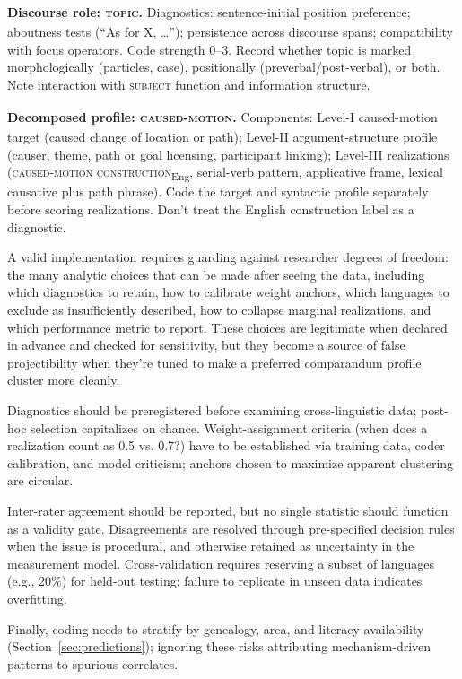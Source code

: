\documentclass[12pt]{article}
\begin{document}
\ex \textbf{Discourse role: \textsc{topic}\textsubscript{\Cross}.} Diagnostics: sentence-initial position preference; aboutness tests (\enquote{As for X, \dots}); persistence across discourse spans; compatibility with focus operators. Code strength 0--3. Record whether topic is marked morphologically (particles, case), positionally (preverbal/post-verbal), or both. Note interaction with \textsc{subject}\textsubscript{\Cross} function and information structure.

\ex \textbf{Decomposed profile: \textsc{caused-motion}\textsubscript{\Cross}.} Components: Level-I caused-motion target (caused change of location or path); Level-II argument-structure profile (causer, theme, path or goal licensing, participant linking); Level-III realizations (\textsc{caused-motion construction}\textsubscript{Eng}, serial-verb pattern, applicative frame, lexical causative plus path phrase). Code the target and syntactic profile separately before scoring realizations. Don't treat the English construction label as a diagnostic.
\z

A valid implementation requires guarding against researcher degrees of freedom: the many analytic choices that can be made after seeing the data, including which diagnostics to retain, how to calibrate weight anchors, which languages to exclude as insufficiently described, how to collapse marginal realizations, and which performance metric to report. These choices are legitimate when declared in advance and checked for sensitivity, but they become a source of false projectibility when they're tuned to make a preferred comparandum profile cluster more cleanly.

Diagnostics should be preregistered before examining cross-linguistic data; post-hoc selection capitalizes on chance. Weight-assignment criteria (when does a realization count as 0.5 vs. 0.7?) have to be established via training data, coder calibration, and model criticism; anchors chosen to maximize apparent clustering are circular.

Inter-rater agreement should be reported, but no single statistic should function as a validity gate. Disagreements are resolved through pre-specified decision rules when the issue is procedural, and otherwise retained as uncertainty in the measurement model. Cross-validation requires reserving a subset of languages (e.g., 20\%) for held-out testing; failure to replicate in unseen data indicates overfitting.

Finally, coding needs to stratify by genealogy, area, and literacy availability (Section~\ref{sec:predictions}); ignoring these risks attributing mechanism-driven patterns to spurious correlates.
\end{document}
